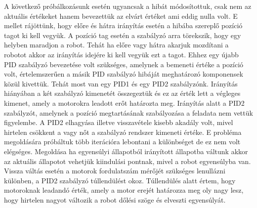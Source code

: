 A következő próbálkozásunk esetén ugyancsak a hibát módosítottuk, csak nem az aktuális értékeket hanem bevezettük az elvárt értéket ami eddig nulla volt. E mellet rájöttünk, hogy előre és hátra irányítás esetén a hibába szereplő pozíció tagot ki kell vegyük. A pozíció tag esetén a szabályzó arra törekszik, hogy egy helyben maradjon a robot. Tehát ha előre vagy hátra akarjuk mozdítani a robotot akkor az irányítás idejére ki kell vegyük ezt a tagot. Ehhez egy újabb PID szabályzó bevezetése volt szükséges, amelynek a bemeneti értéke a pozíció volt, értelemszerűen a másik PID szabályzó hibáját meghatározó komponensek közül kivettük. Tehát most van egy PID1 és egy PID2 szabályzónk. Irányítás hiányában a két szabályzó kimenetét összegeztük és ez az érték lett a végleges kimenet, amely a motorokra leadott erőt határozta meg. Irányítás alatt a PID2 szabályzót, amelynek a pozíció megtartásának szabályozása a feladata nem vettük figyelembe. A PID2 elhagyása illetve visszavétele kisebb akadály volt, mivel hirtelen csökkent a vagy nőt a szabályzó rendszer kimeneti értéke. E probléma megoldására próbáltuk több iterációra lebontani a különbséget de ez nem volt elégséges. Megoldása ha egyensúlyi állapotból irányított állapotba váltunk  akkor az aktuális állapotot vehetjük kiindulási pontnak, mivel a robot egyensúlyba van. Vissza váltás esetén a motorok fordulatszám mérőjét szükséges lenullázni  különben, a PID2 szabályzó túllendülést okoz. Túllendülés alatt értem, hogy motoroknak leadandó érték, amely a motor erejét határozza meg oly nagy lesz, hogy hirtelen nagyot változik a robot dőlési szöge és elveszti egyensúlyát.
